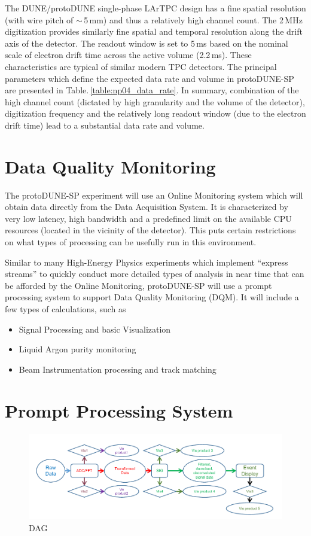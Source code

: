 \documentclass[pdftex,12pt,letter]{article}
\newcommand{\pd}{protoDUNE\xspace}
\begin{document}
The DUNE/\pd single-phase LArTPC design has a fine spatial resolution (with wire pitch of $\sim$\,5\,mm)
and thus a relatively high channel count. The 2\,MHz digitization provides similarly fine spatial and
temporal resolution along the drift axis of the detector. The readout window is  set to 5\,ms 
based on the nominal scale of electron drift time across the active volume (2.2\,ms).  These characteristics are typical of
similar modern TPC detectors. The principal parameters which define the expected data rate and
volume in protoDUNE-SP are presented  in Table.\,\ref{table:np04_data_rate}. In summary, combination
of the high channel count (dictated by high granularity and the volume of the detector), digitization frequency
and the relatively long readout window (due to the electron drift time) lead to a substantial data rate and volume.

\section{Data Quality Monitoring}
The protoDUNE-SP experiment will use an Online Monitoring system which will obtain data directly
from the Data Acquisition System. It is characterized by very low latency, high bandwidth and
a predefined limit on the available CPU resources (located in the vicinity of the detector). This
puts certain restrictions on what types of processing can be usefully run in this environment.

Similar to many High-Energy Physics experiments which implement ``express streams'' to
quickly conduct more detailed types of analysis in near time that can be afforded by the Online Monitoring,
protoDUNE-SP will use a prompt processing system to support Data Quality Monitoring (DQM). It will include
a few types of calculations, such as
\begin{itemize}
\item Signal Processing and basic Visualization
\item Liquid Argon purity monitoring
\item Beam Instrumentation processing and track matching
\end{itemize}

\section{Prompt Processing System}

\begin{figure}[tb]
\centering\includegraphics[width=1.0\textwidth]{dag1.pdf}
\caption{\label{fig:dag1}DAG}
\end{figure}
\end{document}
